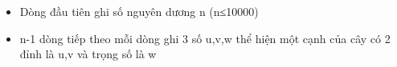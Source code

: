 \begin{itemize}
	\item     Dòng đầu tiên ghi số nguyên dương n (n≤10000)   
	\item     n-1 dòng tiếp theo mỗi dòng ghi 3 số u,v,w thể hiện một cạnh của cây có 2 đỉnh là u,v và trọng số là w   
\end{itemize}

\